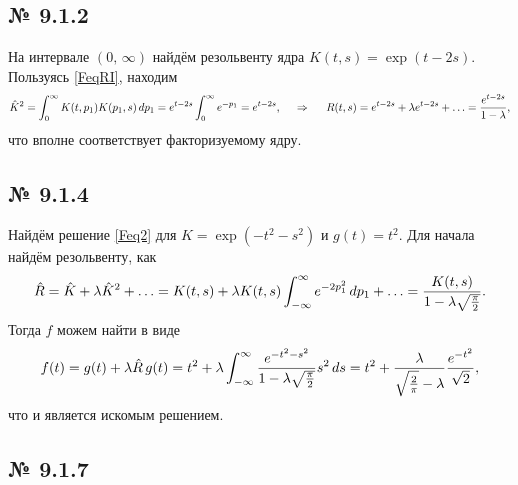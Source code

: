 \subsection*{№ 9.1.2}

На интервале $(0,\, \infty)$ найдём резольвенту ядра $K(t, s) = \exp(t-2s)$. 
Пользуясь \eqref{FeqRI}, находим
\begin{equation*}
	\hat{K}^2 = \int_{0}^{\infty} K(t, p_1) K(p_1, s) \, d p_1 = e^{t-2s} \int_{0}^{\infty} e^{-p_1}  = e^{t-2s},
	\hspace{0.5cm} \Rightarrow \hspace{0.5cm}
	R(t, s) = e^{t-2s} + \lambda e^{t-2s} + \ldots = \frac{e^{t-2s}}{1-\lambda},
\end{equation*}
что вполне соответствует факторизуемому ядру.


\subsection*{№ 9.1.4}

Найдём решение \eqref{Feq2} для $K = \exp\left(-t^2-s^2\right)$ и $g(t) = t^2$. Для начала найдём резольвенту, как
\begin{equation*}
	\hat{R} = \hat{K} + \lambda \hat{K}^2 + \ldots = 
	K(t, s) + \lambda K(t, s) \int_{-\infty}^{\infty} e^{-2 p_1^2} \, d p_1  +
	\ldots = \frac{K(t, s)}{1 - \lambda \sqrt{\frac{\pi}{2}}}.
\end{equation*}
Тогда $f$ можем найти в виде
\begin{equation*}
	f(t) = g(t) + \lambda \hat{R}\, g(t) = t^2 + \lambda \int_{-\infty}^{\infty} \frac{e^{-t^2 - s^2}}{1 - \lambda \sqrt{\frac{\pi}{2}}} s^2 \, d s = 
	t^2 + \frac{\lambda}{\sqrt{\frac{2}{\pi}}-\lambda} \frac{e^{-t^2}}{\sqrt{2}},
\end{equation*}
что и является искомым решением.








\subsection*{№ 9.1.7}

